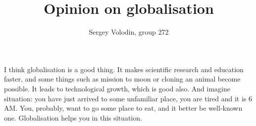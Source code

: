 \documentclass[a4paper]{article}
\author{Sergey Volodin, group 272}
\title{Opinion on globalisation}
\begin{document}
\maketitle
I think globalisation is a good thing. It makes scientific research and education faster, and some things such as mission to moon or cloning an animal become possible. It leads to technological growth, which is good also. And imagine situation: you have just arrived to some unfamiliar place, you are tired and it is 6 AM. You, probably, want to go some place to eat, and it better be well-known one. Globalisation helps you in this situation.
\end{document}
